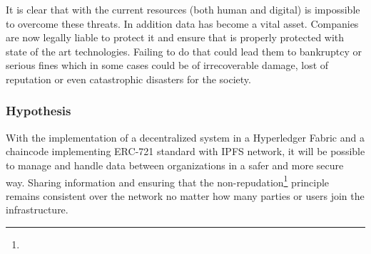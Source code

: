 It is clear that with the current resources (both human and digital) is impossible to overcome these threats. In addition data has become a vital asset. Companies are now legally liable to protect it and ensure that is properly protected with state of the art technologies. Failing to do that could lead them to bankruptcy or serious fines which in some cases could be of irrecoverable damage, lost of reputation or even catastrophic disasters for the society.


\subsubsection{Hypothesis}
\label{analysis_hyp}

With the implementation of a decentralized system in a Hyperledger Fabric and a chaincode implementing \ac{ERC}-721 standard with \ac{IPFS} network, it will be possible to manage and handle data between organizations in a safer and more secure way. Sharing information and ensuring that the non-repudation\footnote{} principle remains consistent over the network no matter how many parties or users join the infrastructure. 